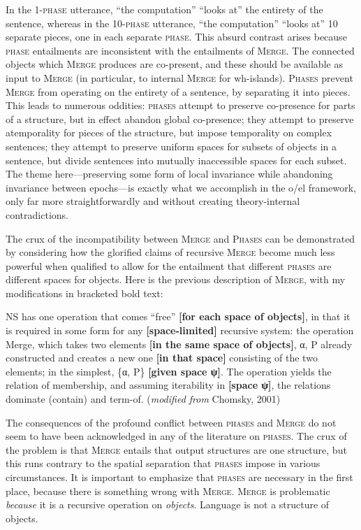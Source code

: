   In the 1-\textsc{phase} utterance, “the computation” “looks at” the entirety of the sentence, whereas in the 10-\textsc{phase} utterance, “the computation” “looks at” 10 separate pieces, one in each separate \textsc{phase}. This absurd contrast arises because \textsc{phase} entailments are inconsistent with the entailments of \textsc{Merge}. The connected objects which \textsc{Merge} produces are co-present, and these should be available as input to \textsc{Merge} (in particular, to internal \textsc{Merge} for wh-islands). \textsc{Phases} prevent \textsc{Merge} from operating on the entirety of a sentence, by separating it into pieces. This leads to numerous oddities: \textsc{phases} attempt to preserve co-presence for parts of a structure, but in effect abandon global co-presence; they attempt to preserve atemporality for pieces of the structure, but impose temporality on complex sentences; they attempt to preserve uniform spaces for subsets of objects in a sentence, but divide sentences into mutually inaccessible spaces for each subset. The theme here—preserving some form of local invariance while abandoning invariance between epochs—is exactly what we accomplish in the o/el framework, only far more straightforwardly and without creating theory-internal contradictions. 

  The crux of the incompatibility between \textsc{Merge} and \textsc{Phases} can be demonstrated by considering how the glorified claims of recursive \textsc{Merge} become much less powerful when qualified to allow for the entailment that different \textsc{phases} are different spaces for objects. Here is the previous description of \textsc{Merge}, with my modifications in bracketed bold text:

NS has one operation that comes “free” \textbf{[for each space of objects]}, in that it is required in some form for any \textbf{[space-limited]} recursive system: the operation Merge, which takes two elements \textbf{[in the same space of objects]}, α, P already constructed and creates a new one \textbf{[in that space]} consisting of the two elements; in the simplest, \{α, P\} \textbf{[given space ψ]}. The operation yields the relation of membership, and assuming iterability in \textbf{[space ψ]}, the relations dominate (contain) and term-of. (\textit{modified from} Chomsky, 2001)

  The consequences of the profound conflict between \textsc{phases} and \textsc{Merge} do not seem to have been acknowledged in any of the literature on \textsc{phases}. The crux of the problem is that \textsc{Merge} entails that output structures are one structure, but this runs contrary to the spatial separation that \textsc{phases} impose in various circumstances. It is important to emphasize that \textsc{phases} are necessary in the first place, because there is something wrong with \textsc{Merge}. \textsc{Merge} is problematic \textit{because} it is a recursive operation on \textit{objects}. Language is not a structure of objects.

